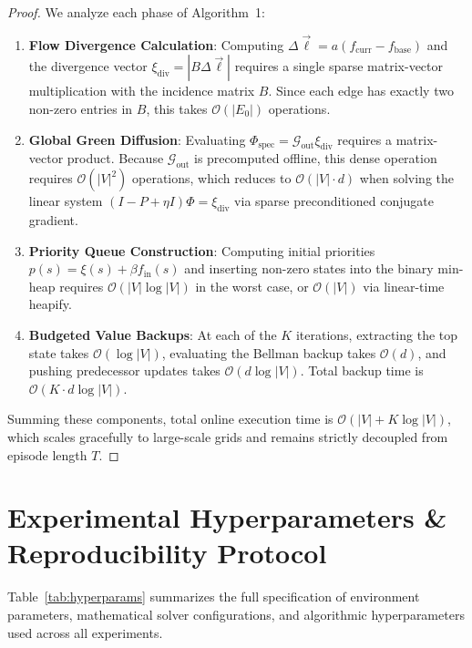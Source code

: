 \documentclass[11pt,a4paper]{article}
\begin{document}
\begin{proof}
We analyze each phase of Algorithm~1:
\begin{enumerate}
    \item \textbf{Flow Divergence Calculation}: Computing $\Delta \vec{\ell} = a (f_{\text{curr}} - f_{\text{base}})$ and the divergence vector $\xi_{\text{div}} = |B \Delta \vec{\ell}|$ requires a single sparse matrix-vector multiplication with the incidence matrix $B$. Since each edge has exactly two non-zero entries in $B$, this takes $\mathcal{O}(|E_0|)$ operations.
    \item \textbf{Global Green Diffusion}: Evaluating $\Phi_{\text{spec}} = \mathcal{G}_{\text{out}} \xi_{\text{div}}$ requires a matrix-vector product. Because $\mathcal{G}_{\text{out}}$ is precomputed offline, this dense operation requires $\mathcal{O}(|V|^2)$ operations, which reduces to $\mathcal{O}(|V| \cdot d)$ when solving the linear system $(I - P + \eta I) \Phi = \xi_{\text{div}}$ via sparse preconditioned conjugate gradient.
    \item \textbf{Priority Queue Construction}: Computing initial priorities $p(s) = \xi(s) + \beta f_{\text{in}}(s)$ and inserting non-zero states into the binary min-heap requires $\mathcal{O}(|V| \log |V|)$ in the worst case, or $\mathcal{O}(|V|)$ via linear-time heapify.
    \item \textbf{Budgeted Value Backups}: At each of the $K$ iterations, extracting the top state takes $\mathcal{O}(\log |V|)$, evaluating the Bellman backup takes $\mathcal{O}(d)$, and pushing predecessor updates takes $\mathcal{O}(d \log |V|)$. Total backup time is $\mathcal{O}(K \cdot d \log |V|)$.
\end{enumerate}
Summing these components, total online execution time is $\mathcal{O}(|V| + K \log |V|)$, which scales gracefully to large-scale grids and remains strictly decoupled from episode length $T$.
\end{proof}

\section{Experimental Hyperparameters \& Reproducibility Protocol}
\label{sec:appendix_hyperparams}

Table~\ref{tab:hyperparams} summarizes the full specification of environment parameters, mathematical solver configurations, and algorithmic hyperparameters used across all experiments.
\end{document}
